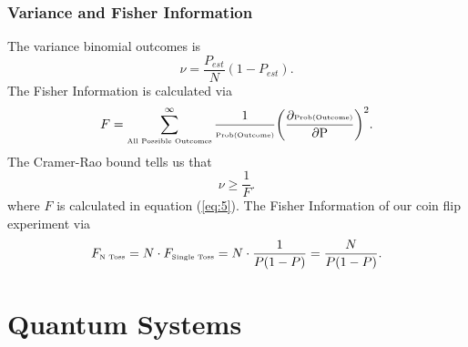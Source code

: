 \documentclass{beamer}
\begin{document}
\begin{frame}
\frametitle{Variance and Fisher Information}
The variance binomial outcomes is 
\begin{equation}\label{eq:4}
\nu=\frac{P_{est}}{N}(1-P_{est}).
\end{equation}
The Fisher Information is calculated via
\begin{equation}\label{eq:5}
F=\sum_{\text{\tiny{All Possible Outcomes}}}^{\infty}\frac{1}{\text{\tiny{Prob(Outcome)}}}\bigg(\frac{\partial \text{\tiny{Prob(Outcome)}}}{\partial \text{P}}\bigg)^2.
\end{equation}
The Cramer-Rao bound tells us that
\begin{equation}\label{eq:6}
\nu\geq\frac{1}{F}.
\end{equation}
where $F$ is calculated in equation (\ref{eq:5}). The Fisher Information of our coin flip experiment via
\begin{equation}\label{eq:7}
F_{\text{\tiny{N Toss}}}=N\cdot F_{\text{\tiny{Single Toss}}}=N\cdot\frac{1}{P(1-P)}=\frac{N}{P(1-P)}.
\end{equation}
\end{frame}
\section{Quantum Systems}
\end{document}
